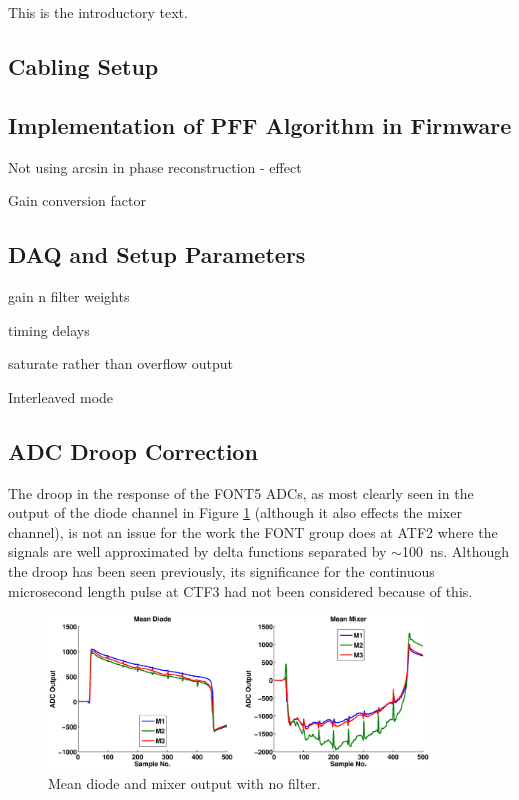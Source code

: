 
This is the introductory text.


\subsection{Cabling Setup}
\label{ss:fontCables}

\subsection{Implementation of PFF Algorithm in Firmware}
\label{ss:pffFirmware}

Not using arcsin in phase reconstruction - effect

Gain conversion factor

\subsection{DAQ and Setup Parameters}
\label{ss:fontDAQ}

gain
n                                                                                                           
filter weights

timing delays

saturate rather than overflow output

Interleaved mode


\subsection{ADC Droop Correction}
\label{ss:droopCorr}

The droop in the response of the FONT5 ADCs, as most clearly seen in the output of the diode channel in Figure \ref{f:diodeDroop} (although it also effects the mixer channel), is not an issue for the work the FONT group does at ATF2 where the signals are well approximated by delta functions separated by \(\sim\)100~ns. Although the droop has been seen previously, its significance for the continuous microsecond length pulse at CTF3 had not been considered because of this.

\begin{figure}
  \centering
  \includegraphics[width=0.9\textwidth]{Figures/commissioning/diodeDroop}
  \caption{Mean diode and mixer output with no filter.}
  \label{f:diodeDroop}
\end{figure}

